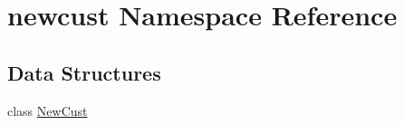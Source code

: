 \hypertarget{namespacenewcust}{}\section{newcust Namespace Reference}
\label{namespacenewcust}
\subsection*{Data Structures}
\begin{DoxyCompactItemize}
\item 
class \hyperlink{classnewcust_1_1_new_cust}{New\+Cust}
\end{DoxyCompactItemize}
